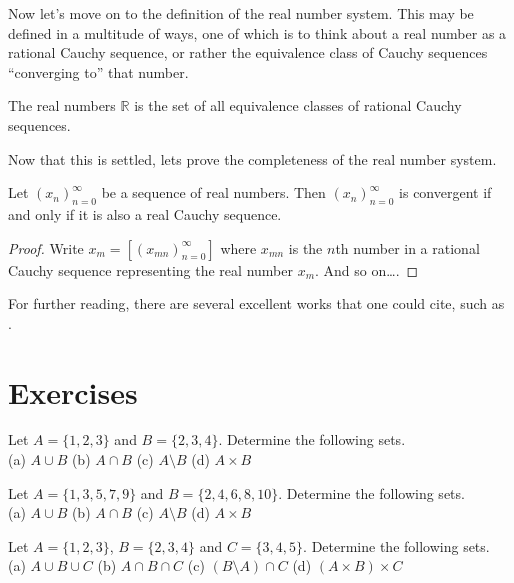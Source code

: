 Now let's move on to the definition of the real number system. This
may be defined in a multitude of ways, one of which is to think about
a real number as a rational Cauchy sequence, or rather the equivalence
class of Cauchy sequences ``converging to'' that number.

\begin{definition}
  \label{def:realnumbers}
  The real numbers $\mathbb{R}$ is the set of all equivalence classes
  of rational Cauchy sequences.
\end{definition}

Now that this is settled, lets prove the completeness of the real
number system.

\begin{theorem}
  \label{th:realnumberscomplete}
  Let $(x_n)_{n=0}^{\infty}$ be a sequence of real numbers.
  Then $(x_n)_{n=0}^{\infty}$ is convergent if and only if
  it is also a real Cauchy sequence.
  \end{theorem}
\begin{proof}
  Write $x_m = [(x_{mn})_{n=0}^{\infty}]$ where
  $x_{mn}$ is the $n$th number in a rational Cauchy sequence
  representing the real number $x_m$. And so on\ldots.
\end{proof}

For further reading, there are several excellent works that one could
cite, such as \cite{Tao2006,Turing1936}.

\section*{Exercises}

\begin{exercise}
  Let $A = \{1, 2, 3\}$ and $B = \{2, 3, 4\}$.
  Determine the following sets. \\
  (a) $A \cup B$ \quad
  (b) $A \cap B$ \quad
  (c) $A \setminus B$ \quad
  (d) $A \times B$
\end{exercise}

\begin{exercise}
  Let $A = \{1, 3, 5, 7, 9\}$ and $B = \{2, 4, 6, 8, 10\}$.
  Determine the following sets. \\
  (a) $A \cup B$ \quad
  (b) $A \cap B$ \quad
  (c) $A \setminus B$ \quad
  (d) $A \times B$
\end{exercise}

\begin{exercise}
  Let $A = \{1, 2, 3\}$, $B = \{2, 3, 4\}$ and $C = \{3, 4, 5\}$.
  Determine the following sets. \\
  (a) $A \cup B \cup C$ \quad
  (b) $A \cap B \cap C$ \quad
  (c) $(B \setminus A) \cap C$ \quad
  (d) $(A \times B) \times C$
\end{exercise}

